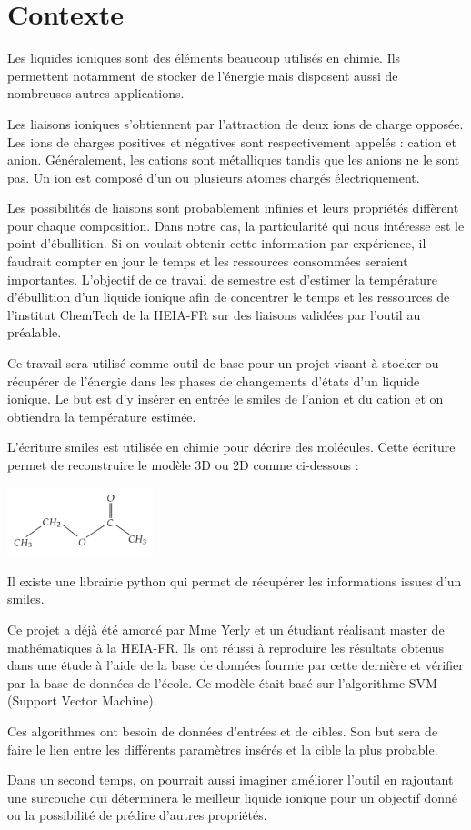 \chapter{Contexte}
\label{chap:contexte}

Les liquides ioniques sont des éléments beaucoup utilisés en chimie. Ils permettent notamment de stocker de l'énergie mais disposent aussi de nombreuses autres applications.

Les liaisons ioniques s'obtiennent par l'attraction de deux ions de charge opposée. Les ions de charges positives et négatives sont respectivement appelés : cation et anion. Généralement, les cations sont métalliques tandis que les anions ne le sont pas. Un ion est composé d'un ou plusieurs atomes chargés électriquement.

Les possibilités de liaisons sont probablement infinies et leurs propriétés diffèrent pour chaque composition. Dans notre cas, la particularité qui nous intéresse est le point d'ébullition. Si on voulait obtenir cette information par expérience, il faudrait compter en jour le temps et les ressources consommées seraient importantes. L'objectif de ce travail de semestre est d'estimer la température d'ébullition d'un liquide ionique afin de concentrer le temps et les ressources de l'institut ChemTech de la HEIA-FR sur des liaisons validées par l'outil au préalable.

Ce travail sera utilisé comme outil de base pour un projet visant à stocker ou récupérer de l'énergie dans les phases de changements d'états d'un liquide ionique. Le but est d'y insérer en entrée le \acrfull{smiles} de l'anion et du cation et on obtiendra la température estimée.

L'écriture \acrshort{smiles} est utilisée en chimie pour décrire des molécules. Cette écriture permet de reconstruire le modèle 3D ou 2D comme ci-dessous :
\begin{center}
   \includegraphics[height=20mm]{img/smiles_example.png}
\end{center}

 
Il existe une librairie python qui permet de récupérer les informations issues d'un \acrshort{smiles}.

Ce projet a déjà été amorcé par Mme Yerly et un étudiant réalisant master de mathématiques à la HEIA-FR. Ils ont réussi à reproduire les résultats obtenus dans une étude à l'aide de la base de données fournie par cette dernière et vérifier par la base de données de l'école. Ce modèle était basé sur l'algorithme SVM (Support Vector Machine).

Ces algorithmes ont besoin de données d'entrées et de cibles. Son but sera de faire le lien entre les différents paramètres insérés et la cible la plus probable.

Dans un second temps, on pourrait aussi imaginer améliorer l'outil en rajoutant une surcouche qui déterminera le meilleur liquide ionique pour un objectif donné ou la possibilité de prédire d'autres propriétés.
